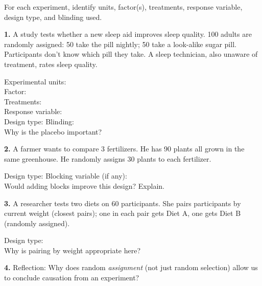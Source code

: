 \documentclass[10pt]{article}
\begin{document}
\namedateperiod

\vspace{0.1in}

\begin{practicebox}
\small
For each experiment, identify units, factor(s), treatments, response variable, design
type, and blinding used.

\vspace{8pt}
\textbf{1.} A study tests whether a new sleep aid improves sleep quality. 100 adults
are randomly assigned: 50 take the pill nightly; 50 take a look-alike sugar pill.
Participants don't know which pill they take. A sleep technician, also unaware of
treatment, rates sleep quality.

\vspace{4pt}
Experimental units: \blank{8cm}\\[4pt]
Factor: \blank{8cm}\\[4pt]
Treatments: \blank{8cm}\\[4pt]
Response variable: \blank{8cm}\\[4pt]
Design type: \blank{4cm} \quad Blinding: \blank{4cm}\\[4pt]
Why is the placebo important? \writeline\\[1pt]\writeline

\vspace{8pt}
\textbf{2.} A farmer wants to compare 3 fertilizers. He has 90 plants all grown in
the same greenhouse. He randomly assigns 30 plants to each fertilizer.

\vspace{4pt}
Design type: \blank{4cm} \quad Blocking variable (if any): \blank{4cm}\\[4pt]
Would adding blocks improve this design? Explain. \writeline\\[1pt]\writeline

\vspace{8pt}
\textbf{3.} A researcher tests two diets on 60 participants. She pairs participants
by current weight (closest pairs); one in each pair gets Diet A, one gets Diet B
(randomly assigned).

\vspace{4pt}
Design type: \blank{7cm}\\[4pt]
Why is pairing by weight appropriate here? \writeline\\[1pt]\writeline

\vspace{8pt}
\textbf{4.} Reflection: Why does random \emph{assignment} (not just random selection)
allow us to conclude causation from an experiment?\\[4pt]
\writeline\\[1pt]\writeline\\[1pt]\writeline
\end{practicebox}
\end{document}
